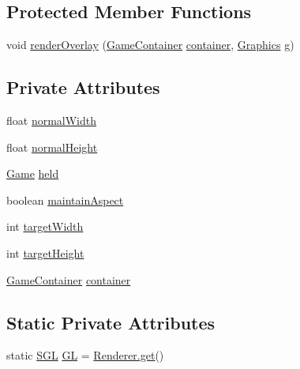 \subsection*{Protected Member Functions}
\begin{DoxyCompactItemize}
\item 
void \mbox{\hyperlink{classorg_1_1newdawn_1_1slick_1_1_scalable_game_a52d3b8fcb2c05da697b2dc22d0187127}{render\+Overlay}} (\mbox{\hyperlink{classorg_1_1newdawn_1_1slick_1_1_game_container}{Game\+Container}} \mbox{\hyperlink{classorg_1_1newdawn_1_1slick_1_1_scalable_game_ae8df04372ae01e645445bc4a22f58c7c}{container}}, \mbox{\hyperlink{classorg_1_1newdawn_1_1slick_1_1_graphics}{Graphics}} g)
\end{DoxyCompactItemize}
\subsection*{Private Attributes}
\begin{DoxyCompactItemize}
\item 
float \mbox{\hyperlink{classorg_1_1newdawn_1_1slick_1_1_scalable_game_a80c5555ac348d1b5224c9cf391baceae}{normal\+Width}}
\item 
float \mbox{\hyperlink{classorg_1_1newdawn_1_1slick_1_1_scalable_game_a47e0975aeb3ea50e10207311e2e9371e}{normal\+Height}}
\item 
\mbox{\hyperlink{interfaceorg_1_1newdawn_1_1slick_1_1_game}{Game}} \mbox{\hyperlink{classorg_1_1newdawn_1_1slick_1_1_scalable_game_a9f1fb24a0827c8d6619e682e6239a475}{held}}
\item 
boolean \mbox{\hyperlink{classorg_1_1newdawn_1_1slick_1_1_scalable_game_aad26ba584204317d6d2bca9bbb5eb716}{maintain\+Aspect}}
\item 
int \mbox{\hyperlink{classorg_1_1newdawn_1_1slick_1_1_scalable_game_a77bf0db185d31f78befc3b9ff9c69a9e}{target\+Width}}
\item 
int \mbox{\hyperlink{classorg_1_1newdawn_1_1slick_1_1_scalable_game_a99f38c5f6f77f872c998a0278a394a50}{target\+Height}}
\item 
\mbox{\hyperlink{classorg_1_1newdawn_1_1slick_1_1_game_container}{Game\+Container}} \mbox{\hyperlink{classorg_1_1newdawn_1_1slick_1_1_scalable_game_ae8df04372ae01e645445bc4a22f58c7c}{container}}
\end{DoxyCompactItemize}
\subsection*{Static Private Attributes}
\begin{DoxyCompactItemize}
\item 
static \mbox{\hyperlink{interfaceorg_1_1newdawn_1_1slick_1_1opengl_1_1renderer_1_1_s_g_l}{S\+GL}} \mbox{\hyperlink{classorg_1_1newdawn_1_1slick_1_1_scalable_game_ae65f7d873f47a0b7898eb2a28a7c4cae}{GL}} = \mbox{\hyperlink{classorg_1_1newdawn_1_1slick_1_1opengl_1_1renderer_1_1_renderer_abe742c3a7dfca67c6c01821d27087308}{Renderer.\+get}}()
\end{DoxyCompactItemize}



